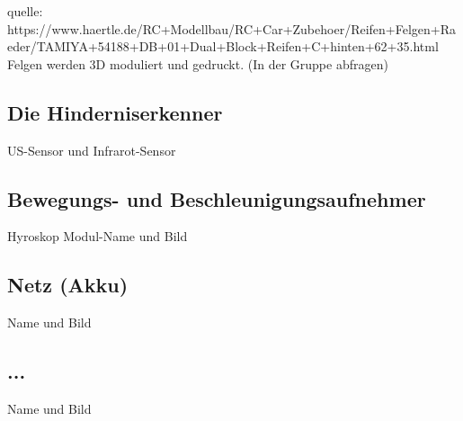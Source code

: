 quelle:
https://www.haertle.de/RC+Modellbau/RC+Car+Zubehoer/Reifen+Felgen+Raeder/TAMIYA+54188+DB+01+Dual+Block+Reifen+C+hinten+62+35.html
Felgen werden 3D moduliert und gedruckt. (In der Gruppe abfragen)

\subsection{Die Hinderniserkenner}


US-Sensor und Infrarot-Sensor

\subsection{Bewegungs- und Beschleunigungsaufnehmer }

Hyroskop Modul-Name und Bild

\subsection{Netz (Akku)}

 Name und Bild
 
 \subsection{...}
 
 Name und Bild

